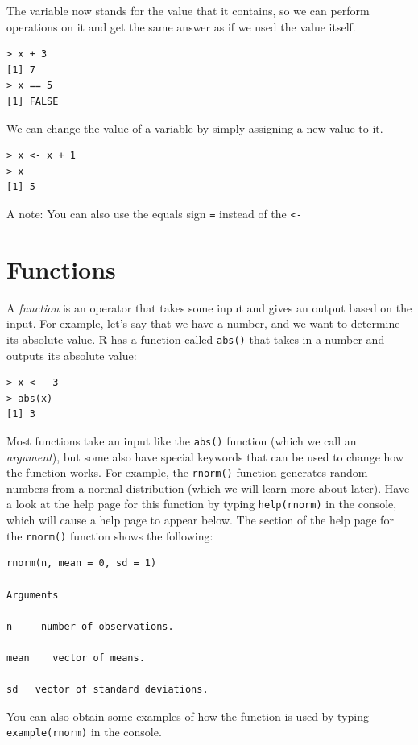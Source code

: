 \documentclass[12pt,]{book}
\begin{document}
The variable now stands for the value that it contains, so we can perform operations on it and get the same answer as if we used the value itself.

\begin{verbatim}
> x + 3
[1] 7
> x == 5
[1] FALSE
\end{verbatim}

We can change the value of a variable by simply assigning a new value to it.

\begin{verbatim}
> x <- x + 1
> x
[1] 5
\end{verbatim}

A note: You can also use the equals sign \texttt{=} instead of the \texttt{\textless{}-}

\hypertarget{functions}{%
\section{Functions}\label{functions}}

A \emph{function} is an operator that takes some input and gives an output based on the input. For example, let's say that we have a number, and we want to determine its absolute value. R has a function called \texttt{abs()} that takes in a number and outputs its absolute value:

\begin{verbatim}
> x <- -3
> abs(x)
[1] 3
\end{verbatim}

Most functions take an input like the \texttt{abs()} function (which we call an \emph{argument}), but some also have special keywords that can be used to change how the function works. For example, the \texttt{rnorm()} function generates random numbers from a normal distribution (which we will learn more about later). Have a look at the help page for this function by typing \texttt{help(rnorm)} in the console, which will cause a help page to appear below. The section of the help page for the \texttt{rnorm()} function shows the following:

\begin{verbatim}
rnorm(n, mean = 0, sd = 1)

Arguments

n     number of observations. 

mean    vector of means.

sd   vector of standard deviations.
\end{verbatim}

You can also obtain some examples of how the function is used by typing \texttt{example(rnorm)} in the console.
\end{document}
